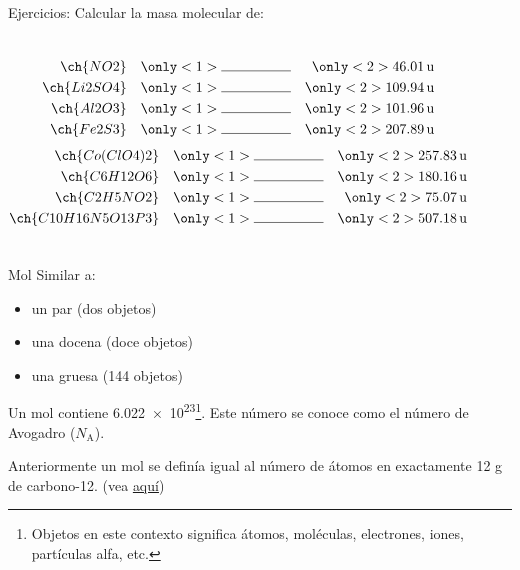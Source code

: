 \documentclass{beamer}
\begin{document}
  \begin{frame}{Ejercicios:}
    Calcular la masa molecular de:
    \begin{columns}
      \begin{align*}
        \ch{NO2}\quad & \only<1>{\line(1,0){50}} & \only<2>{\qty{46.01}{u}}\\
        \ch{Li2SO4}\quad & \only<1>{\line(1,0){50}} & \only<2>{\qty{109.94}{u}}\\
        \ch{Al2O3}\quad & \only<1>{\line(1,0){50}} & \only<2>{\qty{101.96}{u}}\\
        \ch{Fe2S3}\quad & \only<1>{\line(1,0){50}} & \only<2>{\qty{207.89}{u}}  
      \end{align*}
      \begin{align*}
        \ch{Co(ClO4)2}\quad & \only<1>{\line(1,0){50}} & \only<2>{\qty{257.83}{u}}\\
        \ch{C6H12O6}\quad & \only<1>{\line(1,0){50}} & \only<2>{\qty{180.16}{u}}\\
        \ch{C2H5NO2}\quad & \only<1>{\line(1,0){50}} & \only<2>{\qty{75.07}{u}}\\
        \ch{C10H16N5O13P3}\quad & \only<1>{\line(1,0){50}} & \only<2>{\qty{507.18}{u}}
      \end{align*}
    \end{columns}
  \end{frame}
  \begin{frame}{Mol}
    Similar a: 
    \begin{itemize}
      \item un par (dos objetos)
      \item una docena (doce objetos)
      \item una gruesa (144 objetos)
    \end{itemize}
    Un mol contiene \qty{6.022e23}{}\footnote{Objetos en este contexto significa átomos, moléculas, electrones, iones, partículas alfa, etc.}. Este número se conoce como el número de Avogadro (\(N_{\mathrm{A}}\)).\par
    Anteriormente un mol se definía igual al número de átomos en exactamente 12 g de carbono-12. (vea \href{https://en.wikipedia.org/wiki/Mole_(unit)\#Standardization}{aquí})
  \end{frame}
\end{document}
